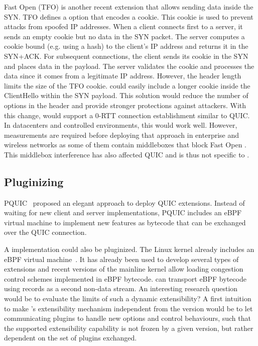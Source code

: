 \tcp Fast Open (TFO) \cite{rfc7413,radhakrishnan2011tcp} is another recent
\tcp extension that allows sending data inside the SYN. TFO defines a
\tcp option that encodes a cookie. This cookie is used to prevent attacks
from spoofed IP addresses. When a client connects first to a server, it sends
an empty cookie but no data in the SYN packet. The server computes a cookie
bound (e.g. using a hash) to the client's IP address and returns it
in the SYN+ACK. For subsequent connections, the client sends its cookie in the SYN
and places data in the payload. The server validates the cookie and processes
the data since it comes from a legitimate IP address. However, the \tcp header
length limits the size of the TFO cookie. \tcpls could easily include
a longer cookie inside the \tls ClientHello within the SYN
payload. This solution would reduce the number of options in the \tcp header
and provide stronger protections against attackers. With this change, \tcpls
would support a 0-RTT connection establishment similar to QUIC. In datacenters and controlled environments, this would work well. However, measurements
are required before deploying that approach in enterprise and
wireless networks as some of them contain middleboxes that block \tcp Fast Open
\cite{paasch2016network}. This middlebox interference has also affected QUIC \cite{langley2017quic} and is thus not specific to \tcp.


\subsection{Pluginizing \tcpls}

PQUIC~\cite{de2019pluginizing} proposed an elegant approach to deploy
QUIC extensions. Instead of waiting for new client and server implementations,
PQUIC includes an eBPF virtual machine to implement new features as bytecode
that can be exchanged over the QUIC connection.

A \tcpls implementation could also be pluginized. The Linux kernel
already includes an eBPF virtual machine~\cite{ebpf:2014}.
It has already been used to develop several types of
\tcp extensions \cite{brakmo2017tcp, tran2019beyond, tran2020beyond}
and recent versions of the mainline kernel allow loading congestion control schemes implemented in eBPF bytecode. \tcpls can transport eBPF bytecode using
\tls records as a second non-data stream.
An interesting research question would be to evaluate the
limits of such a dynamic extensibility? A first intuition to make \tcp's
extensibility mechanism independent from the \tcpls version would be to let \tcpls
communicating plugins to handle new \tcp options and control behaviours, such that the
supported \tcp extensibility capability is not frozen by a given \tcpls
version, but rather dependent on the set of plugins exchanged.

